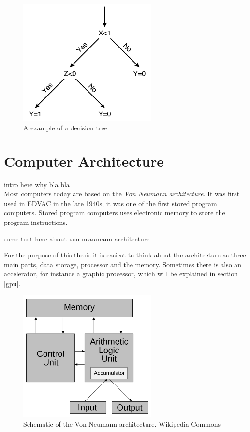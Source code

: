 \documentclass[10pt,a4paper]{report}
\newcounter{example}
\begin{document}
\begin{figure}[h]
    \centering
    \includegraphics[width=7cm]{Decision_Tree.png}
    \caption{A example of a decision tree}
    \label{fig:DecisionTree}
\end{figure}

\clearpage
\section{Computer Architecture}
intro here why bla bla %
\\
Most computers today are based on the \emph{Von Neumann architecture}. It was first used in EDVAC in the late 1940s, it was one of the first stored program computers\cite{von1993first}. Stored program computers uses electronic memory to store the program instructions\cite{computer_arch_2003}.

some text here about von neaumann architecture

For the purpose of this thesis it is easiest to think about the architecture as three main parts, data storage, processor and the memory. Sometimes there is also an accelerator, for instance a graphic processor, which will be explained in section \ref{gpu}.

\begin{figure}[h]
    \centering
    \includegraphics[width=7cm]{Von_Neumann_architecture.png}
    \caption{Schematic of the Von Neumann architecture. Wikipedia Commons}
    \label{fig:VonNeumann}
\end{figure}
\end{document}
